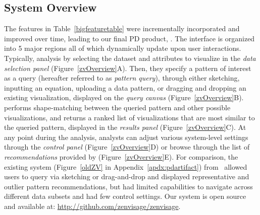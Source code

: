  \subsection{System Overview\label{sec:system}}%
 The features in Table~\ref{bigfeaturetable} were incrementally incorporated and improved over time, leading to our final PD product, \zvpp.  The \zvpp interface is organized into 5 major regions all of which dynamically update upon user interactions. Typically,  analysis by selecting the dataset and attributes to visualize in the \emph{data selection panel} (Figure~\ref{zvOverview}A). Then, they specify a pattern of interest as a query (hereafter referred to as \emph{pattern query}), through either sketching, inputting an equation, uploading a data pattern, or dragging and dropping an existing visualization, displayed on the \emph{query canvas} (Figure~\ref{zvOverview}B). \zvpp performs shape-matching between the queried pattern and other possible visualizations, and returns a ranked list of visualizations that are most similar to the queried pattern, displayed in the \emph{results panel} (Figure~\ref{zvOverview}C). At any point during the analysis, analysts can adjust various system-level settings through the \emph{control panel} (Figure~\ref{zvOverview}D) or browse through the list of \emph{recommendations} provided by \zvpp (Figure~\ref{zvOverview}E). For comparison, the existing \zv system (Figure~\ref{oldZV} in Appendix~\ref{apdx:pdartifact}) from~\cite{Siddiqui2017} allowed users to query via sketching or drag-and-drop and displayed representative and outlier pattern recommendations, but had limited capabilities to navigate across different data subsets and had few control settings. Our \zvpp system is open source and available at: \url{http://github.com/zenvisage/zenvisage}. %
 